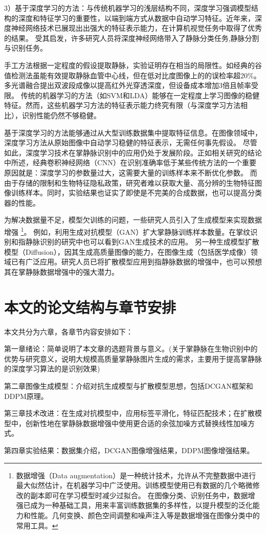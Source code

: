 3）基于深度学习的方法：与传统机器学习的浅层结构不同，深度学习强调模型结构的深度和特征学习的重要性，以端到端方式从数据中自动学习特征\cite{wang2021comparative}。近年来，深度神经网络技术已展现出出强大的特征表示能力，在计算机视觉任务中取得了优秀的结果。
受其启发，许多研究人员将深度神经网络带入了静脉分类任务\cite{itqan2016user},静脉分割与识别任务\cite{qin2017deep}。

手工方法根据一定程度的假设提取静脉，实验证明存在相当的局限性。如经典的谷值检测法虽能有效提取静脉血管中心线，但在低对比度图像上的的误检率超20\%。多光谱融合提出双波段成像以提高红外光穿透深度，但设备成本增加3倍且帧率受限。
传统的机器学习的方法（如SVM和LDA）能够在一定程度上学习图像的稳健特征。然而，这些机器学习方法的特征表示能力终究有限（与深度学习方法相比），识别性能仍然不够稳健。

基于深度学习的方法能够通过从大型训练数据集中提取特征信息。在图像领域中，深度学习方法从原始图像中自动学习稳健的特征表示，无需任何事先假设。
尽管如此，深度学习技术在掌静脉识别中的应用仍处于发展阶段。正如相关研究\cite{jia2021performance}的结论中所述，经典卷积神经网络（CNN）在识别准确率低于某些传统方法的一个重要原因就是：深度学习的参数量过大，这需要大量的训练样本来不断优化参数。
而由于存储的限制和生物特征隐私政策，研究者难以获取大量、高分辨的生物特征图像训练样本。同时，实验结果也证实了即使是不完美的合成数据，也可以提高分类器的性能。

为解决数据量不足，模型欠训练的问题，一些研究人员引入了生成模型来实现数据增强
\footnote{
    数据增强（Data augmentation）是一种统计技术，允许从不完整数据中进行最大似然估计，在机器学习中广泛使用。训练模型使用已有数据的几个略微修改的副本即可在学习模型时减少过拟合。
    在图像分类、识别任务中，数据增强已成为一种基础工具，用来丰富训练数据集的多样性，以提升模型的泛化能力和性能。几何变换、颜色空间调整和噪声注入等是数据增强在图像分类中的常用工具。
    }。
例如，利用生成对抗模型（GAN）扩大掌静脉训练样本数量\cite{ou2022gan}。在掌纹识别\cite{wang2018generative}和指静脉识别\cite{zhang2019gan}的研究中也可以看到GAN生成技术的应用。
另一种生成模型扩散模型（Diffusion），因其生成高质量图像的能力，在图像生成（包括医学成像）领域已有广泛应用\cite{zhang2023survey}。研究人员已将扩散模型应用到指静脉数据的增强中\cite{liu2024diffvein}，也可以预想其在掌静脉数据增强中的强大潜力。

\section{本文的论文结构与章节安排}

\label{sec:arrangement}

本文共分为六章，各章节内容安排如下：

第一章绪论：简单说明了本文章的选题背景与意义。(关于掌静脉在生物识别中的优势与研究意义，说明大规模高质量掌静脉图片生成的需求，主要用于提高掌静脉的深度学习算法的是识别效果)

第二章图像生成模型：介绍对抗生成模型与扩散模型思想，包括DCGAN框架和DDPM原理。

第三章技术改进：在生成对抗模型中，应用标签平滑化，特征匹配技术；在扩散模型中，创新性地在掌静脉数据增强中使用更合适的余弦加噪方式替换线性加噪方式。

第四章实验结果：数据集介绍，DCGAN图像增强结果，DDPM图像增强结果。



